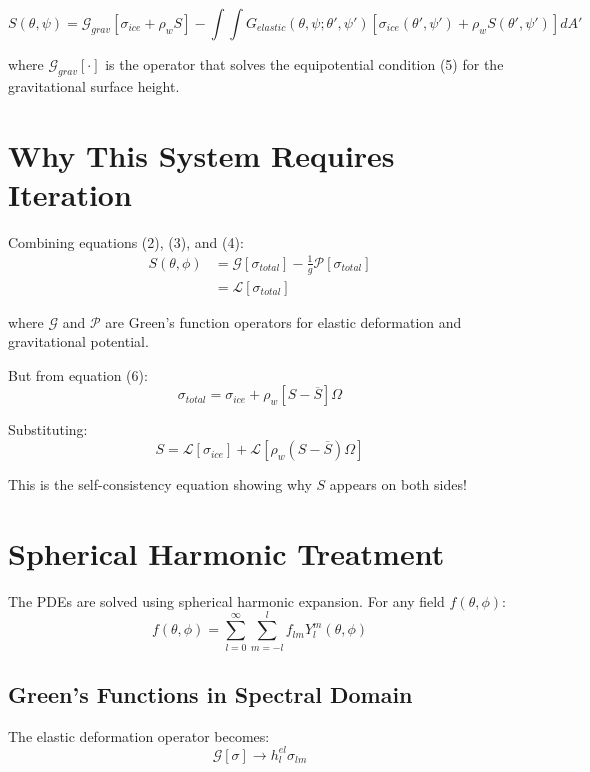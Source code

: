 \documentclass{article}
\begin{document}
\begin{equation}
\boxed{
S(\theta,\psi) = \mathcal{G}_{grav}[\sigma_{ice} + \rho_w S] - \int\int G_{elastic}(\theta,\psi; \theta',\psi') [\sigma_{ice}(\theta',\psi') + \rho_w S(\theta',\psi')] dA'
}
\end{equation}

where $\mathcal{G}_{grav}[\cdot]$ is the operator that solves the equipotential condition (5) for the gravitational surface height.

\section{Why This System Requires Iteration}

Combining equations (2), (3), and (4):
\begin{align}
S(\theta, \phi) &= \mathcal{G}[\sigma_{total}] - \frac{1}{g}\mathcal{P}[\sigma_{total}] \\
&= \mathcal{L}[\sigma_{total}]
\end{align}

where $\mathcal{G}$ and $\mathcal{P}$ are Green's function operators for elastic deformation and gravitational potential.

But from equation (6):
\begin{equation}
\sigma_{total} = \sigma_{ice} + \rho_w [S - \overline{S}] \Omega
\end{equation}

Substituting:
\begin{equation}
S = \mathcal{L}[\sigma_{ice}] + \mathcal{L}[\rho_w (S - \overline{S}) \Omega]
\end{equation}

This is the self-consistency equation showing why $S$ appears on both sides!

\section{Spherical Harmonic Treatment}

The PDEs are solved using spherical harmonic expansion. For any field $f(\theta, \phi)$:
\begin{equation}
f(\theta, \phi) = \sum_{l=0}^{\infty} \sum_{m=-l}^{l} f_{lm} Y_l^m(\theta, \phi)
\end{equation}

\subsection{Green's Functions in Spectral Domain}
The elastic deformation operator becomes:
\begin{equation}
\mathcal{G}[\sigma] \rightarrow h_l^{el} \sigma_{lm}
\end{equation}
\end{document}
